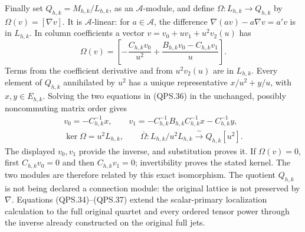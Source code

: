 Finally set \(Q_{h,k}=M_{h,k}/L_{h,k}\), as an \(\mathcal A\)-module,
and define
\(\Omega:L_{h,k}\to Q_{h,k}\) by
\(\Omega(v)=[\nabla v]\). It is \(\mathcal A\)-linear: for
\(a\in\mathcal A\), the difference
\(\nabla(av)-a\nabla v=a'v\) is in \(L_{h,k}\).
In column coefficients a vector
\(v=v_0+uv_1+u^2v_2(u)\) has
\[
 \Omega(v)=
  \left[-\frac{C_{h,k}v_0}{u^2}
       +\frac{B_{h,k}v_0-C_{h,k}v_1}{u}\right].
 \tag{QPS.36}
\]
Terms from the coefficient derivative and from \(u^2v_2(u)\)
are in \(L_{h,k}\). Every element of \(Q_{h,k}\) annihilated
by \(u^2\) has a unique representative \(x/u^2+y/u\), with
\(x,y\in E_{h,k}\). Solving the two equations in (QPS.36)
in the unchanged, possibly noncommuting matrix order gives
\[
 \begin{gathered}
 v_0=-C_{h,k}^{-1}x,\qquad
 v_1=-C_{h,k}^{-1}B_{h,k}C_{h,k}^{-1}x-C_{h,k}^{-1}y,\\
 \ker\Omega=u^2L_{h,k},\qquad
 \overline\Omega:L_{h,k}/u^2L_{h,k}
          \xrightarrow{\ \sim\ }Q_{h,k}[u^2].
 \end{gathered}
 \tag{QPS.37}
\]
The displayed \(v_0,v_1\) provide the inverse, and substitution
proves it. If \(\Omega(v)=0\), first \(C_{h,k}v_0=0\) and
then \(C_{h,k}v_1=0\); invertibility proves the stated kernel.
The two modules are therefore related by this exact isomorphism.
The quotient \(Q_{h,k}\) is not being declared a connection
module: the original lattice is not preserved by \(\nabla\).
Equations (QPS.34)--(QPS.37) extend the scalar-primary
localization calculation to the full original quartet and every
ordered tensor power through the inverse already constructed on
the original full jets.

